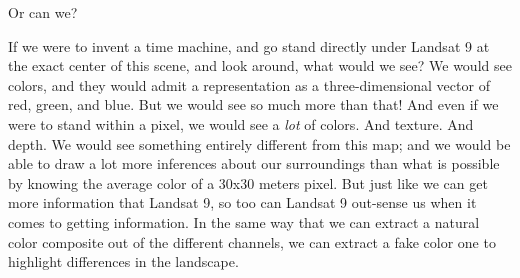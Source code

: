 \documentclass[
  letterpaper,
]{scrbook}
\begin{document}
Or can we?

If we were to invent a time machine, and go stand directly under Landsat
9 at the exact center of this scene, and look around, what would we see?
We would see colors, and they would admit a representation as a
three-dimensional vector of red, green, and blue. But we would see so
much more than that! And even if we were to stand within a pixel, we
would see a \emph{lot} of colors. And texture. And depth. We would see
something entirely different from this map; and we would be able to draw
a lot more inferences about our surroundings than what is possible by
knowing the average color of a 30x30 meters pixel. But just like we can
get more information that Landsat 9, so too can Landsat 9 out-sense us
when it comes to getting information. In the same way that we can
extract a natural color composite out of the different channels, we can
extract a fake color one to highlight differences in the landscape.
\end{document}
